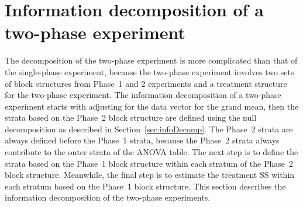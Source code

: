 \documentclass[article]{jss}
\begin{document}
\section{Information decomposition of a two-phase experiment} 
\label{sec:infoiDecompTwoPase}
The decomposition of the two-phase experiment is more complicated than that of the single-phase experiment, because the two-phase experiment involves two sets of block structures from Phase~1 and 2 experiments and a treatment structure for the two-phase experiment. The information decomposition of a two-phase experiment starts with adjusting for the data vector for the grand mean, then the strata based on the Phase~2 block structure are defined using the null decomposition as described in Section~\ref{sec:infoDecomp}. The Phase~2 strata are always defined before the Phase~1 strata, because the Phase~2 strata always contribute to the outer strata of the ANOVA table. The next step is to define the strata based on the Phase~1 block structure within each stratum of the Phase~2 block structure. Meanwhile, the final step is to estimate the treatment SS within each stratum based on the Phase~1 block structure. This section describes the information decomposition of the two-phase experiments.
\end{document}
